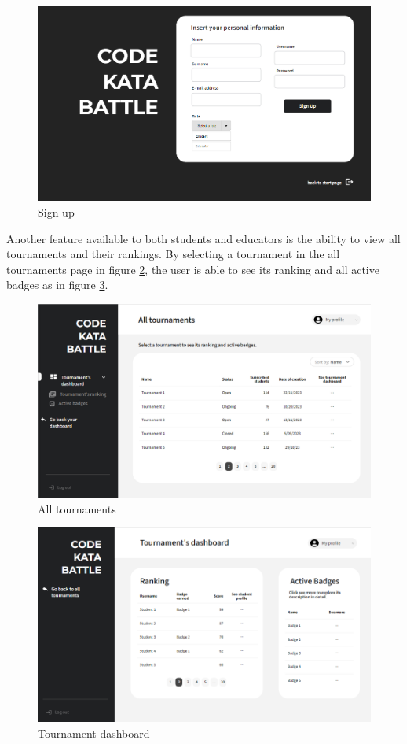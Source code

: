 \begin{figure}[h]
    \centering
    \includegraphics[width=\textwidth]{images/mockups/Signup.png}
    \caption{Sign up}
    \label{fig:signup}
\end{figure}
\clearpage

Another feature available to both students and educators is the ability to view all tournaments and their rankings. By selecting a tournament in the all tournaments page in figure \ref{fig:allT}, the user is able to see its ranking and all active badges as in figure \ref{fig:dashT}.
\begin{figure}[h]
    \centering
    \includegraphics[width=\textwidth]{images/mockups/AllTournaments.png}
    \caption{All tournaments}
    \label{fig:allT}
\end{figure}

\begin{figure}[h]
    \centering
    \includegraphics[width=\textwidth]{images/mockups/TournamentDashboard.png}
    \caption{Tournament dashboard}
    \label{fig:dashT}
\end{figure}

